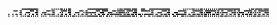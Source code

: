 \documentclass[10pt]{article}
\theoremstyle{plain}
\theoremstyle{definition}
\begin{document}
\begin{table*}[b]
{\begin{minipage}{5.32in}
\[\begin{array}{@{}r@{}}
\begin{array}{@{}l@{}}
\a\a\a\a\a\a\a\a\a\a\a\a\a\a\a\a\b\b\b\b\b\b\b\b\b\b\b\b\b\b\b\b\a\a\a\a \a\a\a\a\a\a\a\a\a\b\a\b\a\b\a\b\a\b\b\b\a\b\a\b\a\b\b\b\a\a\a\a\a\a\a\a \a\a\a\a\a\a\a\a\b\b\b\b\b\b\b\b\b\b\b\b\b\b\b\b\b\b\b\b\a\a\a\a\a\a\a\a \a\b\a\b\b\b\a\b\b\b\b\b\b\b\a\b\b\b\b\b\a\a\a\a\b\b\b\b\a\a\a\a\b\b\b\b \b\b\b\b\b\b\b\b\b\b\b\b\b\b\b\b\a\a\a\a\a\a\a\a\a\a\a\a\a\b\a\b\a\b\a\b \a\b\b\b\a\b\a\b\a\b\b\b\a\b\a\b\a\b\a\b\a\b\a\b\a\b\a\b\b\b\b\b\b\b\b\b \b\b\b\b\b\b\b\b\b\b\b\b\a\a\a\a\a\a\a\a\a\b\a\b\b\b\a\b\b\b\b\b\b\b\a\b \b\b\b\b\mynl
\a\a\a\a\a\a\a\a\b\b\b\b\a\a\b\b\a\a\a\a\a\a\a\a\b\b\b\b\a\a\b\b\a\a\a\a \a\a\a\a\b\b\b\b\a\b\b\b\a\a\a\a\a\a\b\b\b\b\b\b\a\b\b\b\a\a\a\a\a\a\a\a \b\b\b\b\a\a\b\b\a\a\a\a\a\a\a\a\b\b\b\b\a\a\b\b\b\b\b\b\a\a\a\a\b\b\b\b \a\b\b\b\b\b\b\b\a\a\b\b\b\b\b\b\a\b\b\b\a\a\a\a\b\b\b\b\b\b\b\b\b\a\b\b \a\a\a\a\a\a\a\a\b\b\b\b\b\a\b\b\a\a\a\a\a\a\a\a\b\b\b\b\b\b\b\b\a\a\a\a \a\a\b\b\b\b\b\b\b\b\b\b\a\a\b\b\b\b\b\b\b\b\b\b\b\a\b\b\a\a\b\b\a\a\a\a \b\b\b\b\b\a\b\b\a\a\b\b\a\a\a\a\b\b\b\b\b\b\b\b\a\a\b\b\a\a\b\b\b\b\b\b \b\b\b\b\mynl
\a\a\a\a\a\a\a\a\a\a\a\a\a\a\b\b\a\a\a\a\b\b\b\b\a\a\a\a\a\b\b\b\a\a\a\a \b\b\b\b\a\a\a\a\a\a\b\b\a\a\a\a\a\b\a\b\a\a\a\a\a\b\b\b\a\a\a\a\b\b\b\b \a\a\a\a\b\a\b\b\b\b\b\b\b\b\b\b\a\a\a\a\b\b\b\b\a\a\a\a\b\b\b\b\a\a\a\a \b\a\b\b\b\b\b\b\a\b\a\b\a\a\a\a\b\b\b\b\a\a\a\a\a\a\a\a\a\a\a\a\a\a\b\b \a\a\a\a\b\b\b\b\a\a\a\a\a\b\b\b\a\a\a\a\b\b\b\b\a\a\a\a\a\a\b\b\a\a\a\a \a\b\a\b\a\a\a\a\a\b\b\b\a\b\a\b\b\b\b\b\a\a\a\a\b\a\b\b\a\b\a\b\b\b\b\b \a\a\a\a\b\b\b\b\a\b\a\b\b\b\b\b\a\a\a\a\b\a\b\b\a\b\a\b\a\b\a\b\a\a\a\a \b\b\b\b\mynl
\a\a\a\b\a\a\a\b\a\a\b\b\a\a\b\b\a\a\a\b\a\a\a\b\a\a\b\b\a\a\b\b\a\a\a\b \a\a\b\b\a\b\b\b\a\b\b\b\a\a\a\b\a\a\b\b\a\a\b\b\a\a\b\b\a\a\a\b\a\a\a\b \a\a\b\b\a\a\b\b\a\a\a\b\a\a\a\b\a\a\b\b\a\a\b\b\b\a\a\b\b\a\b\b\b\b\b\b \b\b\b\b\b\a\a\b\b\a\b\b\b\a\b\b\b\a\b\b\a\b\b\b\a\b\a\b\b\b\b\b\b\b\b\b \a\a\b\b\a\a\a\b\b\a\b\b\b\a\b\b\a\a\b\b\a\a\b\b\b\b\b\b\b\b\b\b\a\a\b\b \a\a\b\b\b\a\b\b\b\a\b\b\a\b\b\b\a\b\a\b\a\b\b\b\a\b\b\b\a\a\b\b\a\a\a\b \a\a\b\b\a\a\b\b\a\a\b\b\a\a\b\b\a\b\b\b\a\b\b\b\a\a\b\b\a\a\b\b\a\a\b\b \a\a\b\b\mynl
\a\a\a\b\a\a\a\b\a\a\a\b\a\a\a\b\a\b\a\b\a\b\b\b\a\b\a\b\a\b\a\b\a\a\a\b \a\b\a\b\a\a\a\b\a\b\a\b\a\b\a\b\a\b\b\b\a\b\a\b\a\b\a\b\a\b\b\b\a\b\a\b \a\b\a\b\a\b\a\b\b\b\b\b\b\b\b\b\b\b\a\b\b\b\a\b\a\a\b\b\a\b\a\b\a\a\a\b \a\b\a\b\b\b\b\b\b\b\b\b\b\b\a\b\b\b\a\b\a\a\a\b\b\a\a\b\a\a\a\b\b\a\a\b \a\b\a\b\b\b\b\b\a\b\a\b\b\b\a\b\a\a\a\b\b\b\a\b\a\a\a\b\b\b\a\b\a\b\a\b \b\b\b\b\a\b\a\b\b\b\a\b\a\b\b\b\a\b\a\b\a\b\a\b\a\b\a\b\a\b\b\b\a\b\b\b \a\b\a\b\a\b\a\b\a\a\b\b\a\b\a\b\a\a\a\b\a\b\a\b\a\b\b\b\a\b\b\b\a\b\a\b \a\b\a\b

\end{array}
\end{array}\]
\end{minipage}}
\end{table*}
\end{document}
